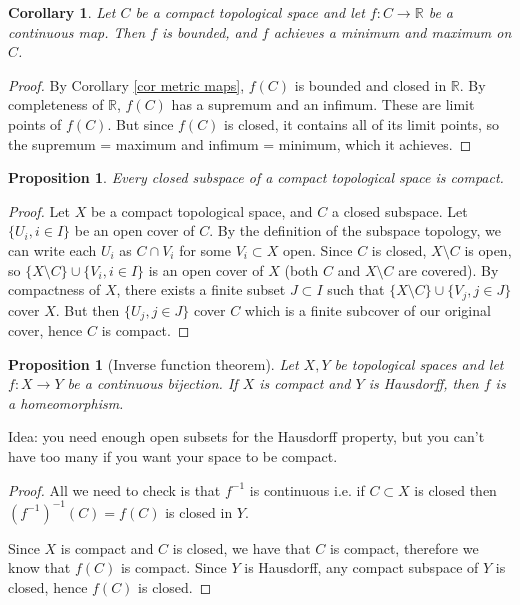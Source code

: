 \documentclass{article}
\theoremstyle{definition}
\theoremstyle{plain}%
\newtheorem{prop}[thm]{Proposition}
\newtheorem*{cor}{Corollary}
\theoremstyle{remark}
\newcommand{\union}{\cup}
\newcommand{\intersection}{\cap}
\newcommand{\R}{\mathbb{R}}
\begin{document}
\begin{cor}
    Let $C$ be a compact topological space and let $f : C \to \R$ be a continuous map. Then $f$ is bounded, and $f$ achieves a minimum and maximum on $C$.
\end{cor}

\begin{proof}
    By Corollary \ref{cor metric maps}, $f(C)$ is bounded and closed in $\R$. By completeness of $\R$, $f(C)$ has a supremum and an infimum. These are limit points of $f(C)$. But since $f(C)$ is closed, it contains all of its limit points, so the supremum = maximum and infimum = minimum, which it achieves.
\end{proof}

\begin{prop}
    Every closed subspace of a compact topological space is compact.
\end{prop}

\begin{proof}
    Let $X$ be a compact topological space, and $C$ a closed subspace. Let $\{U_i, i \in I\}$ be an open cover of $C$. By the definition of the subspace topology, we can write each $U_i$ as $C \intersection V_i$ for some $V_i \subset X$ open. Since $C$ is closed, $X \setminus C$ is open, so $\{X \setminus C\} \union \{V_i, i \in I\}$ is an open cover of $X$ (both $C$ and $X \setminus C$ are covered). By compactness of $X$, there exists a finite subset $J \subset I$ such that $\{X \setminus C\} \union \{V_j, j \in J\}$ cover $X$. But then $\{U_j, j \in J\}$ cover $C$ which is a finite subcover of our original cover, hence $C$ is compact.
\end{proof}

\begin{prop}[Inverse function theorem]
    Let $X,Y$ be topological spaces and let $f: X \to Y$ be a continuous bijection. If $X$ is compact and $Y$ is Hausdorff, then $f$ is a homeomorphism.
\end{prop}

Idea: you need enough open subsets for the Hausdorff property, but you can't have too many if you want your space to be compact.

\begin{proof}
    All we need to check is that $f^{-1}$ is continuous i.e. if $C \subset X$ is closed then $(f^{-1})^{-1}(C) = f(C)$ is closed in $Y$.
    
    Since $X$ is compact and $C$ is closed, we have that $C$ is compact, therefore we know that $f(C)$ is compact. Since $Y$ is Hausdorff, any compact subspace of $Y$ is closed, hence $f(C)$ is closed.
\end{proof}
\end{document}
